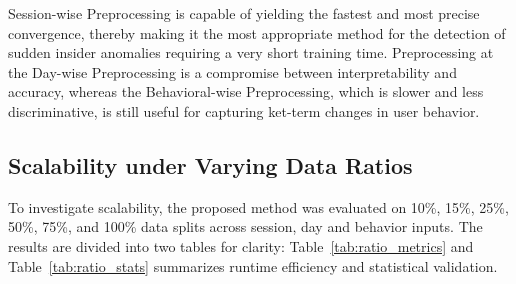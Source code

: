 Session-wise Preprocessing is capable of yielding the fastest and most precise convergence, thereby making it the most appropriate method for the detection of sudden insider anomalies requiring a very short training time. Preprocessing at the Day-wise Preprocessing is a compromise between interpretability and accuracy, whereas the Behavioral-wise Preprocessing, which is slower and less discriminative, is still useful for capturing ket-term changes in user behavior. 

\subsection{Scalability under Varying Data Ratios}
To investigate scalability, the proposed method was evaluated on 10\%, 15\%, 25\%, 50\%, 75\%, and 100\% data splits across session, day and behavior inputs. The results are divided into two tables for clarity: Table~\ref{tab:ratio_metrics} and Table~\ref{tab:ratio_stats} summarizes runtime efficiency and statistical validation.

